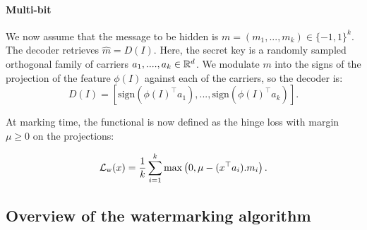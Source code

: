 \paragraph*{Multi-bit}
We now assume that the message to be hidden is  $m = (m_1, ..., m_k) \in \{-1,1\}^k$. 
The decoder retrieves $\hat{m}=D(I)$.
Here, the secret key is a randomly sampled orthogonal family of carriers $a_1,...., a_k \in \mathbb{R}^d$. 
We modulate $m$ into the signs of the projection of the feature $\phi(I)$ against each of the carriers, so the decoder is: 
\begin{equation}
D(I) = \left[\mathrm{sign}\left(\phi(I)^\top a_1\right), ..., \mathrm{sign}\left(\phi(I)^\top a_k\right)\right].
\end{equation}

At marking time,  the functional is now defined as the hinge loss with margin $\mu\geq 0$ on the projections: 

\begin{equation}\label{chap1/eq:loss_multibit}
    \mathcal{L}_{\mathrm{w}}(x) = \frac{1}{k} \sum_{i=1}^k \max \left( 0, \mu - (x^\top a_i).m_i \right).
\end{equation}


\subsection{Overview of the watermarking algorithm}


